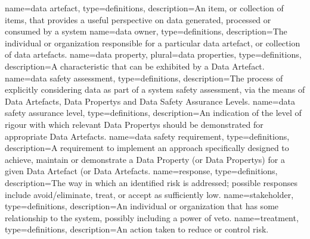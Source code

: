 
{name=data artefact,
	type=definitions,
	description={An item, or collection of items, that provides a useful perspective on data generated, processed or consumed by a system}}
{name=data owner,
	type=definitions,
	description={The individual or organization responsible for a particular data artefact, or collection of data artefacts.}}
{name=data property,
	plural=data properties,
	type=definitions,
	description={A characteristic that can be exhibited by a \gls{Data Artefact}.}}
{name=data safety assessment,
	type=definitions,
	description={The process of explicitly considering data as part of a system safety assessment, via the means of \glspl{Data Artefact}, \glspl{Data Property} and \glspl{Data Safety Assurance Level}.}}
{name=data safety assurance level,
	type=definitions,
	description={An indication of the level of rigour with which relevant \glspl{Data Property} should be demonstrated for appropriate \glspl{Data Artefact}.}}
{name=data safety requirement,
	type=definitions,
	description={A requirement to implement an approach specifically designed to achieve, maintain or demonstrate a \gls{Data Property} (or \glspl{Data Property}) for a given \gls{Data Artefact} (or \glspl{Data Artefact}.}}
{name=response,
	type=definitions,
	description={The way in which an identified risk is addressed; possible responses include avoid/eliminate, treat, or accept as sufficiently low.}}
{name=stakeholder,
	type=definitions,
	description={An individual or organization that has some relationship to the system, possibly including a power of veto.}}
{name=treatment,
	type=definitions,
	description={An action taken to reduce or control risk.}}

